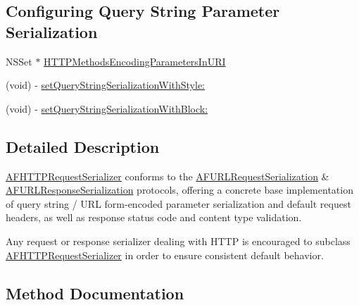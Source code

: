 \subsection*{Configuring Query String Parameter Serialization}
\label{_amgrp405aa0e72fa6384e81d0024aa952f05d}%


 

 \begin{DoxyCompactItemize}
\item 
N\+S\+Set $\ast$ \hyperlink{interface_a_f_h_t_t_p_request_serializer_abc3b1a3688cdc0006389b04c83fa11c2}{H\+T\+T\+P\+Methods\+Encoding\+Parameters\+In\+U\+R\+I}
\item 
(void) -\/ \hyperlink{interface_a_f_h_t_t_p_request_serializer_af86bfabe2989e5730b187fe5f2f2a9e7}{set\+Query\+String\+Serialization\+With\+Style\+:}
\item 
(void) -\/ \hyperlink{interface_a_f_h_t_t_p_request_serializer_a09ab4c6d1c2052702e8264ab2f62b24e}{set\+Query\+String\+Serialization\+With\+Block\+:}
\end{DoxyCompactItemize}


\subsection{Detailed Description}
{\ttfamily \hyperlink{interface_a_f_h_t_t_p_request_serializer}{A\+F\+H\+T\+T\+P\+Request\+Serializer}} conforms to the {\ttfamily \hyperlink{protocol_a_f_u_r_l_request_serialization-p}{A\+F\+U\+R\+L\+Request\+Serialization}} \& {\ttfamily \hyperlink{protocol_a_f_u_r_l_response_serialization-p}{A\+F\+U\+R\+L\+Response\+Serialization}} protocols, offering a concrete base implementation of query string / U\+R\+L form-\/encoded parameter serialization and default request headers, as well as response status code and content type validation.

Any request or response serializer dealing with H\+T\+T\+P is encouraged to subclass {\ttfamily \hyperlink{interface_a_f_h_t_t_p_request_serializer}{A\+F\+H\+T\+T\+P\+Request\+Serializer}} in order to ensure consistent default behavior. 

\subsection{Method Documentation}
\hypertarget{interface_a_f_h_t_t_p_request_serializer_a211e5d5ca44cd3f2fe0e1f1deeb9ef17}{}
